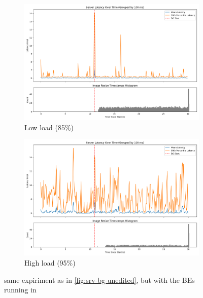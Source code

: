 \begin{figure}[t]
    \centering
    \begin{subfigure}{\columnwidth}
        \includegraphics[width=\columnwidth]{graphs/srv-bg-schedbe-low.png}
        \caption{Low load (85\%)}\label{fig:srv-bg-schedbe-low}
        \vspace{12pt}
    \end{subfigure}
    \begin{subfigure}{\columnwidth}
        \includegraphics[width=\columnwidth]{graphs/srv-bg-schedbe-high.png}
        \caption{High load (95\%)}\label{fig:srv-bg-schedbe-high}
    \end{subfigure}
    \vspace{4pt}
    \caption{same expiriment as in \autoref{fig:srv-bg-unedited}, but with the
    BEs running in \schedbe{}}\label{fig:srv-bg-schedbe}
\end{figure}

